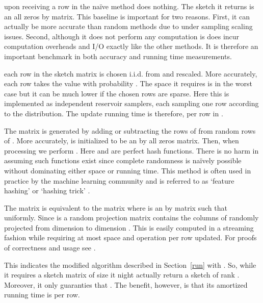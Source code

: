 \documentclass[]{article}
\newcommand{\FD}{Frequent-Directions}
\begin{document}
 upon receiving a row in  the na\"ive method does nothing. The sketch it returns is an all zeros  by  matrix.
This baseline is important for two reasons. 
First, it can actually be more accurate than random methods due to under sampling scaling issues.
Second, although it does not perform any computation is does incur computation overheads and I/O exactly like the other methods.
It is therefore an important benchmark in both accuracy and running time measurements.

 each row in the sketch matrix  is chosen i.i.d. from  and rescaled.
More accurately, each row  takes the value  with probability .
The space it requires is  in the worst case but it can be much lower if the chosen rows are sparse.
Here this is implemented as  independent reservoir samplers, each sampling one row according to the distribution.
The update running time is therefore,  per row in .

 The matrix  is generated by adding or subtracting the rows of  from random rows of .
More accurately,  is initialized to be an  by  all zeros matrix. 
Then, when processing  we perform .
Here  and  are perfect hash functions. 
There is no harm in assuming such functions exist since complete randomness is na\"ively possible without dominating either space or running time.
This method is often used in practice by the machine learning community and is referred to as `feature hashing' or `hashing trick'  \cite{WeinbergerDLSA2009}.

The matrix  is equivalent to the matrix  where  is an  by  matrix such that  uniformly. 
Since  is a random projection matrix \cite{Achlioptas01}  contains the  columns of  randomly projected from dimension  to dimension . 
This is easily computed in a streaming fashion while requiring at most  space and  operation per row updated.
For proofs of correctness and usage see \cite{PapadimitriouTRV1998}\cite{Vempala2004}\cite{Sarlos06}\cite{tygert07PNAS}.

\noindent {\bf \FD:} This indicates the modified algorithm described in Section~\ref{run} with . 
So, while it requires a sketch matrix of size  it night actually return a sketch of rank .
Moreover, it only guaranties that .
The benefit, however, is that its amortized running time is  per row.
\end{document}
